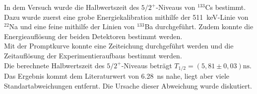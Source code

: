 In dem Versuch wurde die Halbwertszeit des $5/2^+$-Niveaus von $^{133}$Cs bestimmt. Dazu wurde zuerst eine grobe Energiekalibration mithilfe der \SI{511}{keV}-Linie von $^{22}$Na und eine feine mithilfe der Linien von $^{133}$Ba durchgeführt. Zudem konnte die Energieauflösung der beiden Detektoren bestimmt werden.\\
Mit der Promptkurve konnte eine Zeiteichung durchgeführt werden und die Zeitauflösung der Experimentieraufbaus bestimmt werden.\\
Die berechnete Halbwertszeit des $5/2^+$-Niveaus beträgt $T_{1/2} = (5,81 \pm 0,03) \si{\nano\second}$. Das Ergebnis kommt dem Literaturwert von \SI{6,28}{\nano\second} \cite{cs133} nahe, liegt aber viele Standartabweichungen entfernt. Die Ursache dieser Abweichung wurde diskutiert.  